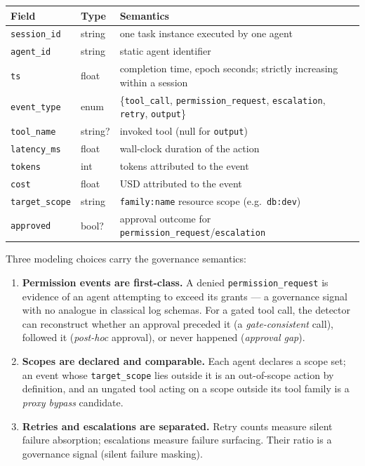 \documentclass[10pt]{article}
\newcommand{\code}[1]{\texttt{#1}}
\begin{document}
\begin{center}
\small
\begin{tabular}{@{}llp{7.4cm}@{}}
\toprule
Field & Type & Semantics \\
\midrule
\code{session\_id} & string & one task instance executed by one agent \\
\code{agent\_id} & string & static agent identifier \\
\code{ts} & float & completion time, epoch seconds; strictly increasing within a session \\
\code{event\_type} & enum & \{\code{tool\_call}, \code{permission\_request}, \code{escalation}, \code{retry}, \code{output}\} \\
\code{tool\_name} & string? & invoked tool (null for \code{output}) \\
\code{latency\_ms} & float & wall-clock duration of the action \\
\code{tokens} & int & tokens attributed to the event \\
\code{cost} & float & USD attributed to the event \\
\code{target\_scope} & string & \code{family:name} resource scope (e.g.\ \code{db:dev}) \\
\code{approved} & bool? & approval outcome for \code{permission\_request}/\code{escalation} \\
\bottomrule
\end{tabular}
\end{center}

Three modeling choices carry the governance semantics:
\begin{enumerate}
  \item \textbf{Permission events are first-class.} A denied
        \code{permission\_request} is evidence of an agent attempting to exceed
        its grants --- a governance signal with no analogue in classical log
        schemas. For a gated tool call, the detector can reconstruct whether an
        approval preceded it (a \emph{gate-consistent} call), followed it
        (\emph{post-hoc} approval), or never happened (\emph{approval gap}).
  \item \textbf{Scopes are declared and comparable.} Each agent declares a
        scope set; an event whose \code{target\_scope} lies outside it is an
        out-of-scope action by definition, and an ungated tool acting on a
        scope outside its tool family is a \emph{proxy bypass} candidate.
  \item \textbf{Retries and escalations are separated.} Retry counts measure
        silent failure absorption; escalations measure failure surfacing. Their
        ratio is a governance signal (silent failure masking).
\end{enumerate}
\end{document}
